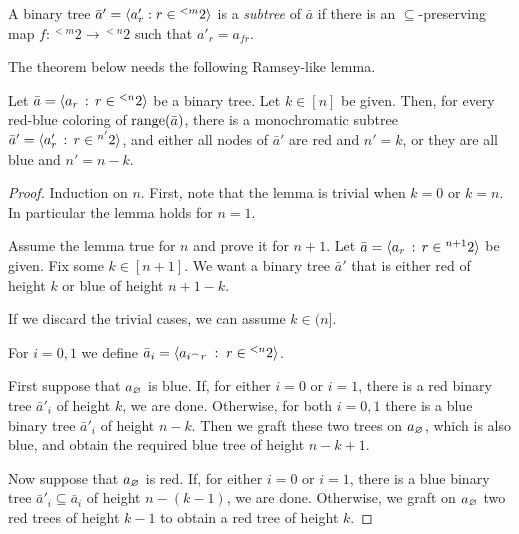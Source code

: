 \documentclass[scombinatorics.tex]{subfiles}
\begin{document}
A binary tree $\bar a'=\langle a'_r:r\in{}^{<m}2\rangle$ is a \emph{subtree\/} of $\bar a$ if there is an $\subseteq$-preserving map $f:{}^{<m}2\to{}^{<n}2$ such that $a'_r=a_{fr}$.

The theorem below needs the following Ramsey-like lemma.



\begin{lemma}\label{lem_Reamsey_tree}
  Let $\bar a=\langle a_r\, :\, r\in{}^{<n}2\rangle$ be a binary tree.
  Let $k\in[n]$ be given.
  Then, for every red-blue coloring of $\mathop{\rm range}(\bar a)$,  there is a monochromatic subtree $\bar a'=\langle a'_r\, :\, r\in{}^{n'}2\rangle$, and either all nodes of $\bar a'$ are red and $n'=k$, or they are all blue and $n'=n-k$.
\end{lemma}

\begin{proof}
  Induction on $n$.
  First, note that the lemma is trivial when $k=0$ or $k=n$.
  In particular the lemma holds for $n=1$.

  Assume the lemma true for $n$ and prove it for $n+1$.
  Let  $\bar a=\langle a_r\, :\, r\in{}^{n+1}2\rangle$ be given.
  Fix some $k\in[n+1]$. 
  We want a binary tree $\bar a'$ that is either red of height $k$ or blue of height $n+1-k$.
  
  If we discard the trivial cases, we can assume $k\in(n]$.

  For $i=0,1$ we define $\bar a_i=\langle a_{i^\frown r}\;:\;r\in {}^{<n}2\rangle$.

  First suppose that $a_\varnothing$ is blue.
  If, for either $i=0$ or $i=1$, there is a red binary tree $\bar a'_i$ of height $k$, we are done.
  Otherwise, for both $i=0,1$ there is a blue binary tree $\bar a'_i$ of height $n-k$.
  Then we graft these two trees on $a_\varnothing$, which is also blue, and obtain the required blue tree of height $n-k+1$.
  
  Now suppose that $a_\varnothing$ is red.
  If, for either $i=0$ or $i=1$, there is a blue binary tree $\bar a'_i\subseteq \bar a_i$ of height $n-(k-1)$, we are done.
  Otherwise, we graft on $a_\varnothing$ two red trees of height $k-1$ to obtain a red tree of height $k$.  
\end{proof}
\end{document}
